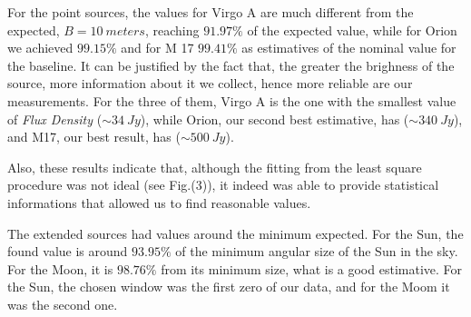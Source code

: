 \documentclass{article}
\begin{document}
For the point sources, the values for Virgo A are much different from
the expected, $B = 10 \ meters$, reaching $91.97\%$ of the expected
value, while for Orion we achieved $99.15\%$ and for M 17 $99.41\%$ as
estimatives of the nominal value for the baseline. It can be justified
by the fact that, the greater the brighness of the source, more
information about it we collect, hence more reliable are our
measurements. For the three of them, Virgo A is the one with the smallest
value of \emph{Flux Density} ($\sim 34 \ Jy$), while Orion, our second best
estimative, has ($\sim 340 \ Jy$), and M17, our best result, has ($\sim
500 \ Jy$).

Also, these results indicate that, although the fitting from the least
square procedure was not ideal (see Fig.(3)), it indeed was able to
provide statistical informations that allowed us to find reasonable
values.

The extended sources had values around the minimum expected. For the
Sun, the found value is around $93.95\%$ of the minimum angular size of
the Sun in the sky. For the Moon, it is $98.76\%$ from its minimum
size, what is a good estimative. For the Sun, the chosen window was the
first zero of our data, and for the Moom it was the second one. 
\end{document}
